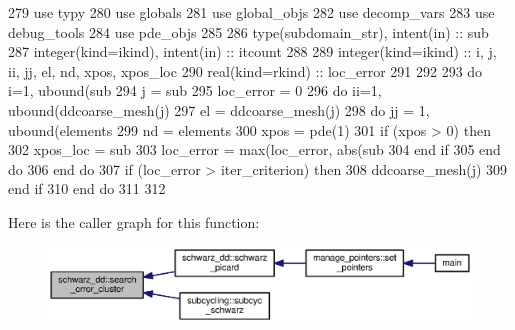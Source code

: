 \begin{DoxyCode}
279         \textcolor{keywordtype}{use }typy
280         \textcolor{keywordtype}{use }globals
281         \textcolor{keywordtype}{use }global_objs
282         \textcolor{keywordtype}{use }decomp_vars
283         \textcolor{keywordtype}{use }debug_tools
284         \textcolor{keywordtype}{use }pde_objs
285 
286         \textcolor{keywordtype}{type}(subdomain_str), \textcolor{keywordtype}{intent(in)} :: sub
287         \textcolor{keywordtype}{integer(kind=ikind)}, \textcolor{keywordtype}{intent(in)} :: itcount
288 
289         \textcolor{keywordtype}{integer(kind=ikind)} :: i, j, ii, jj, el, nd, xpos, xpos\_loc
290         \textcolor{keywordtype}{real(kind=rkind)} :: loc\_error
291         
292 
293         \textcolor{keywordflow}{do} i=1, ubound(sub%
294           j = sub%
295           loc\_error = 0
296           \textcolor{keywordflow}{do} ii=1, ubound(ddcoarse_mesh(j)%
297             el = ddcoarse_mesh(j)%
298             \textcolor{keywordflow}{do} jj = 1, ubound(elements%
299               nd = elements%
300               xpos = pde(1)%
301               \textcolor{keywordflow}{if} (xpos > 0) \textcolor{keywordflow}{then}
302                 xpos\_loc = sub%
303                 loc\_error = max(loc\_error, abs(sub%
304 \textcolor{keywordflow}{              end if}
305 \textcolor{keywordflow}{            end do}
306 \textcolor{keywordflow}{          end do}
307           \textcolor{keywordflow}{if} (loc\_error > iter_criterion) \textcolor{keywordflow}{then}
308             ddcoarse_mesh(j)%
309 \textcolor{keywordflow}{          end if}
310 \textcolor{keywordflow}{        end do}
311   
312 
\end{DoxyCode}


Here is the caller graph for this function\+:\nopagebreak
\begin{figure}[H]
\begin{center}
\leavevmode
\includegraphics[width=350pt]{namespaceschwarz__dd_a61d339e34b15f9787c35b202ad97ae71_icgraph}
\end{center}
\end{figure}


